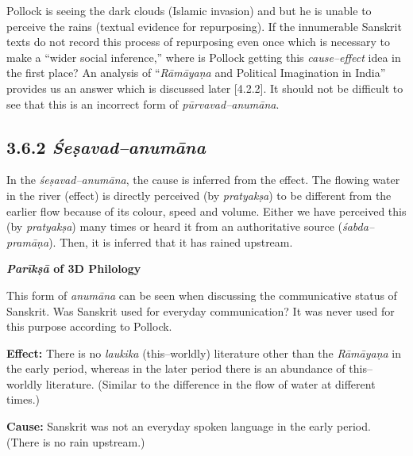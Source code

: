 \vspace{-.3cm}

Pollock is seeing the dark clouds (Islamic invasion) and but he is unable to perceive the rains (textual evidence for repurposing). If the innumerable Sanskrit texts do not record this process of repurposing even once which is necessary to make a “wider social inference,” where is Pollock getting this \textit{cause–effect} idea in the first place? An analysis of “\textit{Rāmāyaṇa }and Political Imagination in India” provides us an answer which is discussed later [4.2.2]. It should not be difficult to see that this is an incorrect form of \textit{pūrvavad–anumāna}.


\vspace{-.3cm}

\subsection*{3.6.2 {\it {\bfseries Śeṣavad–anumāna}}}

\vspace{-.3cm}

In the \textit{śeṣavad–anumāna}, the cause is inferred from the effect. The flowing water in the river (effect) is directly perceived (by \textit{pratyakṣa}) to be different from the earlier flow because of its colour, speed and volume. Either we have perceived this (by \textit{pratyakṣa}) many times or heard it from an authoritative source (\textit{śabda–pramāṇa}). Then, it is inferred that it has rained upstream.

\textbf{\textit{Parīkṣā} of 3D Philology}

This form of \textit{anumāna} can be seen when discussing the communicative status of Sanskrit. Was Sanskrit used for everyday communication? It was never used for this purpose according to Pollock.

\textbf{Effect:} There is no \textit{laukika} (this–worldly) literature other than the \textit{Rāmāyaṇa} in the early period, whereas in the later period there is an abundance of this–worldly literature. (Similar to the difference in the flow of water at different times.)

\textbf{Cause:} Sanskrit was not an everyday spoken language in the early period. (There is no rain upstream.)

